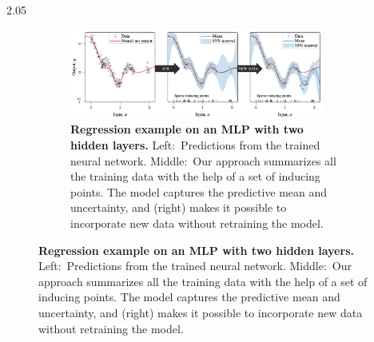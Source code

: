 \documentclass[final,12pt]{beamer}
\newlength{\colwidth}
\newlength\figureheight
\newlength\figurewidth
\begin{document}
\begin{frame}[t]
\begin{columns}[t]
\begin{column}{2.05\colwidth}
\begin{minipage}{\textwidth}
    \begin{figure}[t!]
    \begin{subfigure}[b]{0.65\textwidth}\centering
    \centering\scriptsize
    \includegraphics[width=0.92\textwidth]{fig/regression.png}
    \caption{\footnotesize \textbf{Regression example on an MLP with two hidden layers.} Left:~Predictions from the trained neural network. Middle:~Our approach summarizes all the training data with the help of a set of inducing points. The model captures the predictive mean and uncertainty, and (right) makes it possible to incorporate new data without retraining the model.}

\end{subfigure}
\end{figure}
\end{minipage}
\end{column}
\end{columns}
\end{frame}
\end{document}
